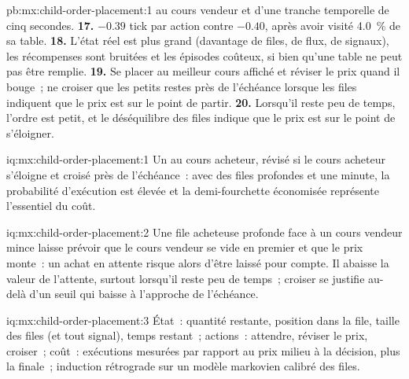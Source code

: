 \begin{solution}{pb:mx:child-order-placement:1}
au cours vendeur et d'une tranche temporelle de cinq secondes.
\textbf{17.} $-0.39$ tick par action contre $-0.40$, après avoir visité 4.0~\% de sa table.
\textbf{18.} L'état réel est plus grand (davantage de files, de flux, de signaux), les récompenses sont bruitées et les épisodes coûteux, si bien qu'une table ne peut pas être remplie.
\textbf{19.} Se placer au meilleur cours affiché et réviser le prix quand il bouge~; ne croiser que les petits restes près de l'échéance lorsque les files indiquent que le prix est sur le point
de partir.
\textbf{20.} Lorsqu'il reste peu de temps, l'ordre est petit, et le déséquilibre des files indique que le prix est sur le point de s'éloigner.
\end{solution}

\begin{solution}{iq:mx:child-order-placement:1}
Un  au cours acheteur, révisé si le cours acheteur s'éloigne et croisé près de l'échéance~: avec des files profondes et une minute, la probabilité d'exécution est élevée
et la demi-fourchette économisée représente l'essentiel du coût.
\end{solution}

\begin{solution}{iq:mx:child-order-placement:2}
Une file acheteuse profonde face à un cours vendeur mince laisse prévoir que le cours vendeur se vide en premier et que le prix monte~: un achat en attente risque alors d'être laissé pour compte. Il abaisse la
valeur de l'attente, surtout lorsqu'il reste peu de temps~; croiser se justifie au-delà d'un seuil qui baisse à l'approche de l'échéance.
\end{solution}

\begin{solution}{iq:mx:child-order-placement:3}
État~: quantité restante, position dans la file, taille des files (et tout signal), temps restant~; actions~: attendre, réviser le prix, croiser~; coût~: exécutions mesurées par rapport au
prix milieu à la décision, plus la  finale~; induction rétrograde sur un modèle markovien calibré des files.
\end{solution}

